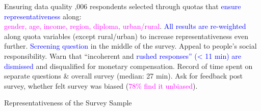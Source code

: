 

\begin{frame}{Ensuring data quality}
\bbs
{},006 respondents selected through quotas that  \textcolor{blue}{ensure representativeness} along: \\ \textcolor{magenta}{gender, age, income, region, diploma, urban/rural}.
\ip \textcolor{blue}{All results are re-weighted} along quota variables (except rural/urban) to increase representativeness even further.
\ip \textcolor{blue}{Screening question} in the middle of the survey. 
\ip Appeal to people's social responsibility. 
\ip Warn that ``incoherent and \textcolor{blue}{rushed responses'' (< 11 min) are dismissed} and disqualified for monetary compensation.
\ip Record of time spent on separate questions \& overall survey (median: 27 min).
\ip Ask for feedback post survey, whether felt survey was biased (\textcolor{magenta}{78\% find it unbiased}).
\ee
\end{frame}

\begin{frame}{Representativeness of the Survey Sample}
\begin{table}[h!]
	\begin{center}
		\scalebox{0.55}{}
	\end{center}
\end{table}	
\end{frame}

